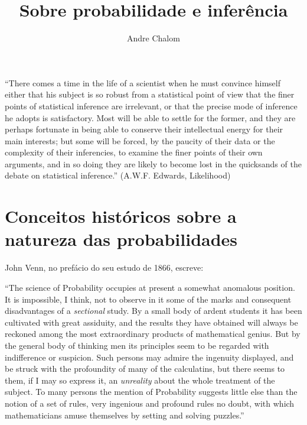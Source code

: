 \documentclass[12pt,a4paper]{article}
\begin{document}
\title{Sobre probabilidade e inferência}
\author{Andre Chalom}
\maketitle
\tableofcontents
\cleardoublepage

\null
\vfill
``There comes a time in the life of a scientist when he must convince himself
either that his subject is so robust from a statistical point of view that
the finer points of statistical inference are irrelevant, or that the precise
mode of inference he adopts is satisfactory. Most will be able to settle for
the former, and they are perhaps fortunate in being able to conserve their
intellectual energy for their main interests; but some will be forced, by the
paucity of their data or the complexity of their inferencies, to examine
the finer points of their own arguments, and in so doing they are likely
to become lost in the quicksands of the debate on statistical inference.''
(A.W.F. Edwards, Likelihood)

\cleardoublepage

\section{Conceitos históricos sobre a natureza das probabilidades}

John Venn, no prefácio do seu estudo de 1866, escreve:

``The science of Probability occupies at present a somewhat anomalous position. It is impossible, I think, not to observe
in it some of the marks and consequent disadvantages of a {\em sectional} study. By a small body of ardent students it
has been cultivated with great assiduity, and the results they have obtained will always be reckoned among the most 
extraordinary products of mathematical genius. But by the general body of thinking men its principles seem to be regarded
with indifference or suspicion. Such persons may admire the ingenuity displayed, and be struck with the profoundity
of many of the calculatins, but there seems to them, if I may so express it, an {\em unreality} about the whole treatment
of the subject. To many persons the mention of Probability suggests little else than the notion of a set of rules, very
ingenious and profound rules no doubt, with which mathematicians amuse themselves by setting and solving puzzles.''
\cite{Venn1866}
\end{document}
